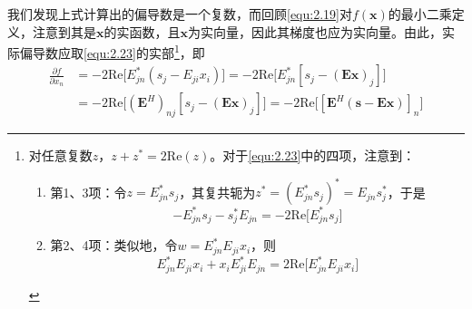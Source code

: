 \documentclass[12pt]{article}
\begin{document}
我们发现上式计算出的偏导数是一个复数，而回顾\autoref{equ:2.19}对$f(\bm{x})$的最小二乘定义，注意到其是$\bm{x}$的实函数，且$\bm{x}$为实向量，因此其梯度也应为实向量。由此，实际偏导数应取\autoref{equ:2.23}的实部\footnote{对任意复数$z$，$z+z^*=2\mathrm{Re}(z)$。对于\autoref{equ:2.23}中的四项，注意到：
\begin{enumerate}
    \item 第1、3项：令$z=E_{jn}^* s_j$，其复共轭为$z^*=(E_{jn}^* s_j)^*=E_{jn} s_j^*$，于是
    \begin{equation}
        -E_{jn}^* s_j-s_j^* E_{jn}=-2\mathrm{Re}\bigg[E_{jn}^* s_j\bigg]
    \end{equation}
    \item 第2、4项：类似地，令$w=E_{jn}^* E_{ji} x_i$，则
    \begin{equation}
        E_{jn}^* E_{ji} x_i+x_i E_{ji}^* E_{jn}=2\mathrm{Re}\bigg[E_{jn}^* E_{ji} x_i\bigg]
    \end{equation}
\end{enumerate}
}，即
\begin{equation}
    \begin{aligned}
        \frac{\partial f}{\partial x_n}
        &=-2\mathrm{Re}\bigg[E_{jn}^*\left(s_j-E_{ji} x_i\right)\bigg]
        =-2\mathrm{Re}\bigg[E_{jn}^*\left[s_j-(\mathbf{E}\bm{x})_j\right]\bigg] \\
        &=-2\mathrm{Re}\bigg[\left(\mathbf{E}^H\right)_{nj}\left[s_j-(\mathbf{E}\bm{x})_j\right]\bigg]
        =-2\mathrm{Re}\bigg[\left[\mathbf{E}^H\left(\bm{s}-\mathbf{E}\bm{x}\right)\right]_n\bigg]
    \end{aligned}
    \label{equ:2.24}
\end{equation}
\end{document}
